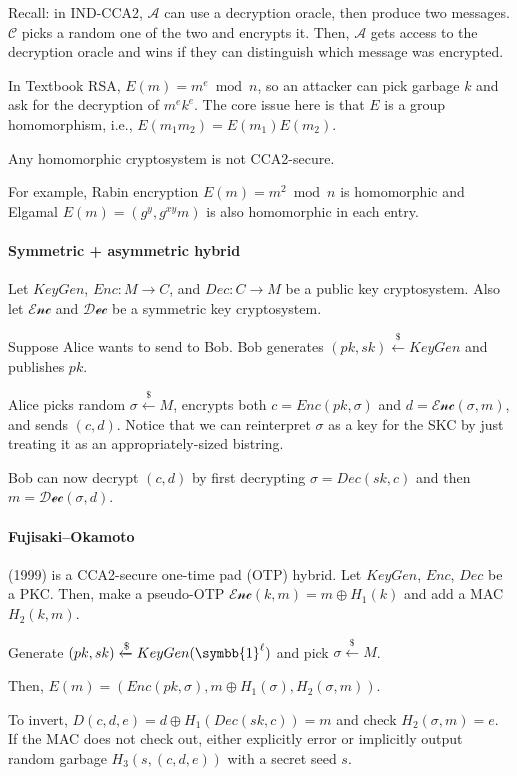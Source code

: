 \documentclass[notes]{agony}
\newcommand{\xgets}{\xleftarrow}
\newcommand{\one}{\symbb{1}}
\begin{document}
Recall: in IND-CCA2, $\mathcal A$ can use a decryption oracle,
then produce two messages.
$\mathcal C$ picks a random one of the two and encrypts it.
Then, $\mathcal A$ gets access to the decryption oracle
and wins if they can distinguish which message was encrypted.

In Textbook RSA, $E(m) = m^e \bmod n$,
so an attacker can pick garbage $k$ and ask for the decryption of $m^e k^e$.
The core issue here is that $E$ is a group homomorphism, i.e.,
$E(m_1m_2) = E(m_1)E(m_2)$.

\begin{remark}
  Any homomorphic cryptosystem is not CCA2-secure.
\end{remark}

For example, Rabin encryption $E(m) = m^2 \bmod n$ is homomorphic and
Elgamal $E(m) = (g^y, g^{xy}m)$ is also homomorphic in each entry.

\paragraph{Symmetric + asymmetric hybrid}
Let $KeyGen$, $Enc : M \to C$, and $Dec : C \to M$ be a public key cryptosystem.
Also let $\mathcal{Enc}$ and $\mathcal{Dec}$ be a symmetric key cryptosystem.

Suppose Alice wants to send to Bob.
Bob generates $(pk, sk) \xgets{\$} KeyGen$ and publishes $pk$.

Alice picks random $\sigma \xgets{\$} M$,
encrypts both $c = Enc(pk, \sigma)$ and $d = \mathcal{Enc}(\sigma, m)$,
and sends $(c, d)$.
Notice that we can reinterpret $\sigma$ as a key for the SKC
by just treating it as an appropriately-sized bistring.

Bob can now decrypt $(c, d)$ by first decrypting $\sigma = Dec(sk, c)$
and then $m = \mathcal{Dec}(\sigma, d)$.

\paragraph{Fujisaki--Okamoto} (1999) is a CCA2-secure one-time pad (OTP) hybrid.
Let $KeyGen$, $Enc$, $Dec$ be a PKC.
Then, make a pseudo-OTP $\mathcal{Enc}(k,m) = m \oplus H_1(k)$
and add a MAC $H_2(k,m)$.

Generate $(pk, sk) \xgets{\$} KeyGen(\one^\ell)$
and pick $\sigma \xgets{\$} M$.

Then, $E(m) = (Enc(pk, \sigma), m \oplus H_1(\sigma), H_2(\sigma,m))$.

To invert, $D(c, d, e) = d \oplus H_1(Dec(sk, c)) = m$
and check $H_2(\sigma, m) = e$.
If the MAC does not check out, either explicitly error
or implicitly output random garbage $H_3(s,(c,d,e))$ with a secret seed $s$.
\end{document}

